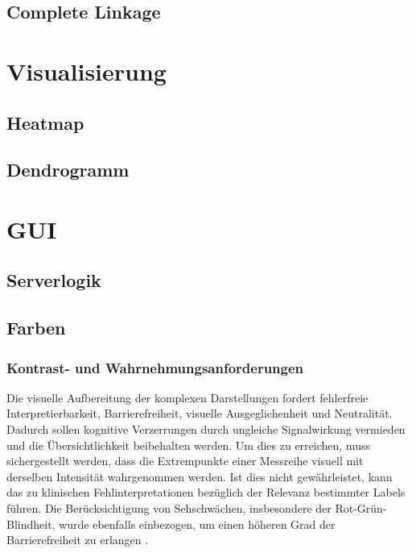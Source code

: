 \documentclass[12pt]{article}
\begin{document}
\subsection{Complete Linkage}
\label{complete-linkage}

\newpage
\pagestyle{fancy}
\fancyhead{}
\section{Visualisierung}
\label{visualisierung}

\subsection{Heatmap}
\label{heatmap}

\subsection{Dendrogramm}
\label{dendrogramm}

\newpage
\pagestyle{fancy}
\fancyhead{}
\section{GUI}
\label{gui}

\subsection{Serverlogik}
\label{serverlogik}


\newpage
\pagestyle{fancy}
\fancyhead{}
\subsection{Farben}
\subsubsection{Kontrast- und Wahrnehmungsanforderungen}

Die visuelle Aufbereitung der komplexen Darstellungen fordert fehlerfreie Interpretierbarkeit, Barrierefreiheit, visuelle Ausgeglichenheit und Neutralität. Dadurch sollen kognitive Verzerrungen durch ungleiche Signalwirkung vermieden und die Übersichtlichkeit beibehalten werden. Um dies zu erreichen, muss sichergestellt werden, dass die Extrempunkte einer Messreihe visuell mit derselben Intensität wahrgenommen werden. Ist dies nicht gewährleistet, kann das zu klinischen Fehlinterpretationen bezüglich der Relevanz bestimmter Labels führen. Die Berücksichtigung von Sehschwächen, insbesondere der Rot-Grün-Blindheit, wurde ebenfalls einbezogen, um einen höheren Grad der Barrierefreiheit zu erlangen \cite{Crameri2020}.
\end{document}
